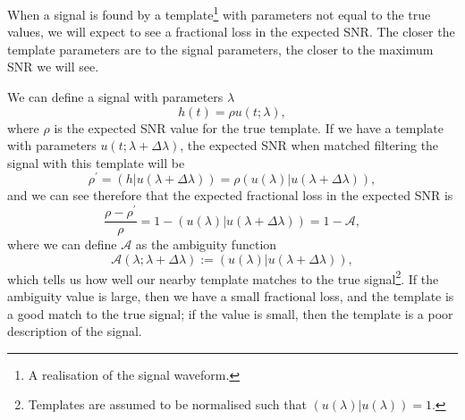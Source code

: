 When a signal is found by a template\footnote{A realisation of the \gwadj signal waveform.} with parameters not equal to the true values, we will expect to see a fractional loss in the expected SNR. The closer the template parameters are to the signal parameters, the closer to the maximum SNR we will see. 

We can define a signal with parameters $\lambda$
%
\begin{equation}
    h(t) = \rho u(t;\lambda),
\end{equation}
where $\rho$ is the expected SNR value for the true template. If we have a template with parameters $u(t;\lambda + \Delta \lambda)$, the expected SNR when matched filtering the signal with this template will be
%
\begin{equation}
    \rho^{\prime} = (h|u(\lambda + \Delta \lambda)) = \rho(u(\lambda)|u(\lambda + \Delta \lambda)),
\end{equation}
%
and we can see therefore that the expected fractional loss in the expected SNR is
%
\begin{equation}
    \frac{\rho - \rho^{\prime}}{\rho} = 1 - (u(\lambda)|u(\lambda + \Delta \lambda)) = 1 - \mathcal{A},
\end{equation}
%
where we can define $\mathcal{A}$ as the ambiguity function
%
\begin{equation}
    \mathcal{A}(\lambda;\lambda + \Delta \lambda) := (u(\lambda)|u(\lambda + \Delta \lambda)),
\end{equation}
%
which tells us how well our nearby template matches to the true signal\footnote{Templates are assumed to be normalised such that $(u(\lambda)|u(\lambda)) = 1$.}. If the ambiguity value is large, then we have a small fractional loss, and the template is a good match to the true signal; if the value is small, then the template is a poor description of the signal.

